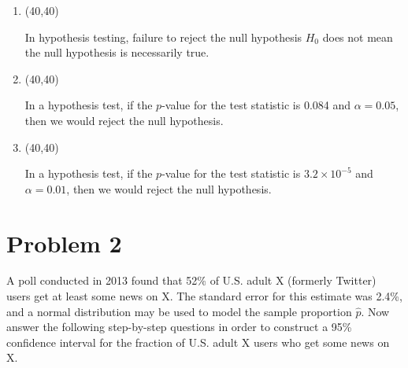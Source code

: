 \documentclass[11pt,twoside]{article}
\newcommand{\?}{\stackrel{?}{=}}
\newcommand{\gr}{\color{green!40!black}}
\begin{document}
\begin{enumerate}[\bf (i)]
  \smallskip
  
\item \hfill
  \begin{minipage}{.1\linewidth}
    \framebox(40,40){\gr  }
  \end{minipage}\quad
  \begin{minipage}{.85\linewidth}
    In hypothesis testing, failure to reject the null hypothesis $H_0$ does not mean the null hypothesis is necessarily true.
  \end{minipage}

  \smallskip
  

\item \hfill
  \begin{minipage}{.1\linewidth}
    \framebox(40,40){\gr  }
  \end{minipage}\quad
  \begin{minipage}{.85\linewidth}
    In a hypothesis test, if the $p$-value for the test statistic is 0.084 and $\alpha = 0.05$, then we would reject the null hypothesis.
  \end{minipage}

  \item \hfill
  \begin{minipage}{.1\linewidth}
    \framebox(40,40){\gr  }
  \end{minipage}\quad
  \begin{minipage}{.85\linewidth}
    In a hypothesis test, if the $p$-value for the test statistic is $3.2\times 10^{-5}$ and $\alpha = 0.01$, then we would reject the null hypothesis.
  \end{minipage}  

\end{enumerate}

\eject
 
  \section*{Problem 2       }
  A poll conducted in 2013 found that 52\% of U.S. adult X (formerly Twitter) users get at least some news on X. The standard error for this estimate was 2.4\%, and a normal distribution may be used to model the sample proportion $\hat p$. Now answer the following step-by-step questions in order to   construct a 95\% confidence interval for the fraction of U.S. adult X users who get some news on X.
\end{document}
